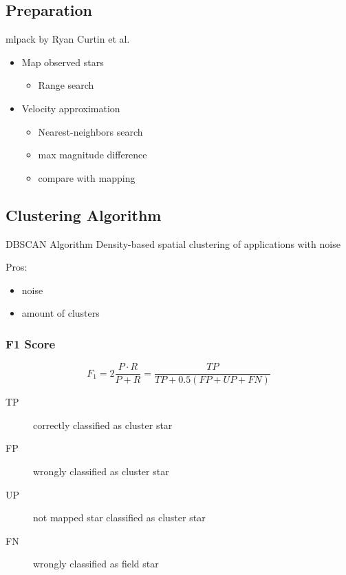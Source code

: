 \documentclass{beamer}
\begin{document}
\subsection{Preparation}
\begin{frame}

mlpack by Ryan Curtin et al.
\\[2ex]
\begin{itemize}
\item Map observed stars 
	\begin{itemize}
	\item Range search
	\end{itemize}
\item Velocity approximation
	\begin{itemize}
	\item Nearest-neighbors search
	\item max magnitude difference
	\item compare with mapping
	\end{itemize}
\end{itemize}

\end{frame}

\subsection{Clustering Algorithm}

\begin{frame}

\begin{block}{DBSCAN Algorithm}
Density-based spatial clustering of applications with noise
\end{block}

Pros:
\begin{itemize}
\item noise
\item amount of clusters
\end{itemize}

\end{frame}


\begin{frame}
\frametitle{F1 Score}
\begin{equation*}
F_1 = 2 \frac{P \cdot R}{P+R} = \frac{TP}{TP+0.5(FP+UP+FN)}
\end{equation*}
\vspace{\baselineskip}
\begin{description}
\item[TP] correctly classified as cluster star
\item[FP] wrongly classified as cluster star
\item[UP] not mapped star classified as cluster star
\item[FN] wrongly classified as field star
\end{description}

\end{frame}
\end{document}
